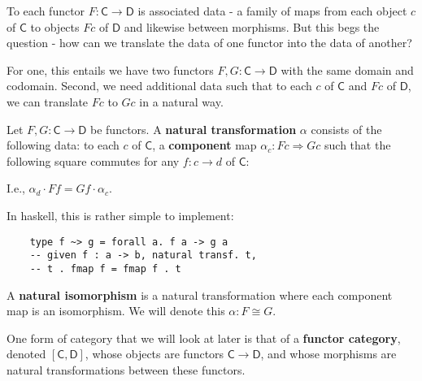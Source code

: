 \documentclass[tikz]{beamer}
\newcommand{\cat}[1]{\bm{ \mathsf{#1} }}
\newcommand{\cc}{\cat{C}}
\newcommand{\dd}{\cat{D}}
\theoremstyle{definition}
\begin{document}
\frame
{
	To each functor $F : \cc \to \dd$ is associated data - a family of maps from each object $c$ of $\cc$ to objects $Fc$ of $\dd$ and likewise between morphisms. But this begs the question - how can we translate the data of one functor into the data of another?  
}

\frame
{
	For one, this entails we have two functors $F, G : \cc \to \dd$ with the same domain and codomain. Second, we need additional data such that to each $c$ of $\cc$ and $Fc$ of $\dd$, we can translate $Fc$ to $Gc$ in a natural way. 
}


\begin{frame}[fragile]

	\begin{definition}
		Let $F,G : \cc \to \dd$ be functors. A \textbf{natural transformation} $\alpha$ consists of the following data: to each $c$ of $\cc$, a \textbf{component} map $\alpha_c : Fc \Rightarrow Gc$ such that the following square commutes for any $f : c \to d$ of $\cc$: 
		
		\begin{center}
		\end{center}
	\end{definition}
\end{frame}

\frame
{
	I.e., $\alpha_d \cdot Ff = Gf \cdot \alpha_c$.
}

\begin{frame}[fragile]

	In haskell, this is rather simple to implement: 
	
	\begin{verbatim}
	type f ~> g = forall a. f a -> g a
	-- given f : a -> b, natural transf. t,
	-- t . fmap f = fmap f . t 
	\end{verbatim}
\end{frame}

\frame
{
	A \textbf{natural isomorphism} is a natural transformation where each component map is an isomorphism. We will denote this $\alpha : F \cong G$. 
	
}

\frame
{
	One form of category that we will look at later is that of a \textbf{functor category}, denoted $[\cc, \dd]$, whose objects are functors $\cc \to \dd$, and whose morphisms are natural transformations between these functors. 
}
\end{document}
